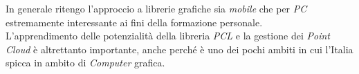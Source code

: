 In generale ritengo l'approccio a librerie grafiche sia \emph{mobile} che per \emph{PC} estremamente interessante ai fini della formazione personale.\\

L'apprendimento delle potenzialità della libreria \emph{PCL} e la gestione dei \emph{Point Cloud} è altrettanto importante, anche perché è uno dei pochi ambiti in cui l'Italia spicca in ambito di \emph{Computer} grafica.










